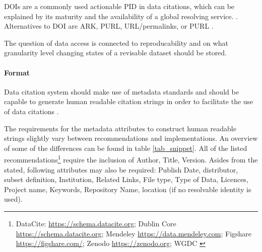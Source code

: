 \documentclass[letterpaper, twocolumn, parskip=half, fontsize=8pt, DIV=calc]{scrartcl}
\begin{document}
\glspl{DOI} are a commonly used actionable \gls{PID} in data citations, which can be explained by its maturity and the availability of a global resolving service.  \citep{Honor2016}. Alternatives to \gls{DOI} are \gls{ARK}, \gls{PURL}, \gls{URL}/permalinks, or \gls{PURL} \citep{Klump2016, Starr2015}.

The question of data access is connected to reproducability and on what granularity level changing states of a revisable dataset should be stored.



\paragraph{Format}
Data citation system should make use of metadata standards \citep{CODATA2013} and should be capable to generate human readable citation strings in order to facilitate the use of data citations \citep{Buneman2016, Rauber2015}. 

The requirements for the metadata attributes to construct human readable strings slightly vary between recommendations and implementations. An overview of some of the differences can be found in table \ref{tab_snippet}. All of the listed recommendations\footnote{DataCite: \url{https://schema.datacite.org}; Dublin Core \url{https://schema.datacite.org}; Mendeley \url{https://data.mendeley.com}; Figshare \url{https://figshare.com/}; Zenodo \url{https://zenodo.org}; WGDC \citep{Rauber2015}} require the inclusion of Author, Title, Version. 
Asides from the stated, following attributes may also be required:
Publish Date, distributor, subset definition, Institution, Related Links, File type, Type of Data, Licences, Project name, Keywords, Repository Name, location (if no resolvable identity is used).
\end{document}
